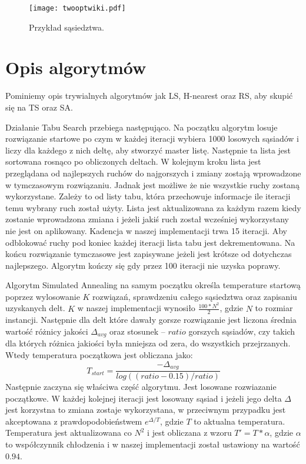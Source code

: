 \documentclass{article}
\begin{document}
\begin{figure} 
\begin{center}
\texttt{[image: twooptwiki.pdf]}
\end{center}
\caption{Przykład sąsiedztwa.}
\label{fig:schemat2}
\end{figure}


\section{Opis algorytmów}

Pominiemy opis trywialnych algorytmów jak LS, H-nearest oraz RS, aby skupić się na TS oraz SA.

Działanie Tabu Search przebiega następująco. Na początku algorytm losuje rozwiązanie startowe po czym w każdej iteracji wybiera 1000 losowych sąsiadów i liczy dla każdego z nich deltę, aby stworzyć master listę. Następnie ta lista jest sortowana rosnąco po obliczonych deltach. W kolejnym kroku lista jest przeglądana od najlepszych ruchów do najgorszych i zmiany zostają wprowadzone w tymczasowym rozwiązaniu. Jadnak jest możliwe że nie wszystkie ruchy zostaną wykorzystane. Zależy to od listy tabu, która przechowuje informacje ile iteracji temu wybrany ruch został użyty. Lista jest aktualizowana za każdym razem kiedy zostanie wprowadzona zmiana i jeżeli jakiś ruch został wcześniej wykorzystany nie jest on aplikowany. Kadencja w naszej implementacji trwa 15 iteracji. Aby odblokować ruchy pod koniec każdej iteracji lista tabu jest dekrementowana. Na końcu rozwiązanie tymczasowe jest zapisywane jeżeli jest krótsze od dotychczas najlepszego. Algorytm kończy się gdy przez 100 iteracji nie uzyska poprawy.


Algorytm Simulated Annealing na samym początku określa temperature startową poprzez wylosowanie $K$ rozwiązań, sprawdzeniu całego sąsiedztwa oraz zapisaniu uzyskanych delt. $K$ w naszej implementacji wynosiło $\frac{100 * N^2}{2}$, gdzie $N$ to rozmiar instancji. Następnie dla delt które dawały gorsze rozwiązanie jest liczona średnia wartość różnicy jakości $\Delta_{avg}$ oraz stosunek -- $ratio$ gorszych sąsiadów, czy takich dla których różnica jakiości była mniejsza od zera, do wszystkich przejrzanych. Wtedy temperatura początkowa jest obliczana jako:
$$
T_{start} = \frac{-\Delta_{avg}}{log((ratio - 0.15) / ratio)}
$$
Następnie zaczyna się właściwa część algorytmu. Jest losowane rozwiazanie początkowe. W każdej kolejnej iteracji jest losowany sąsiad i jeżeli jego delta $\Delta$ jest korzystna to zmiana zostaje wykorzystana, w przeciwnym przypadku jest akceptowana z prawdopodobieństwem $e^{\Delta/T}$, gdzie $T$ to aktualna temperatura. Temperatura jest aktualizowana co $N^2$ i jest obliczana z wzoru $T'=T*\alpha$, gdzie $\alpha$ to współczynnik chłodzenia i w naszej implementacji został ustawiony na wartość $0.94$.
\end{document}
